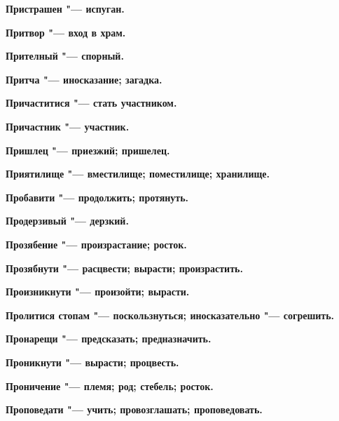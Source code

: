 \begin{mymulticols}{2}
\bfseries Пристрашен\normalfont{} "--- испуган. 




\bfseries Притвор\normalfont{} "--- вход в храм. 




\bfseries Прителный\normalfont{} "--- спорный. 




\bfseries Притча\normalfont{} "--- иносказание; загадка. 




\bfseries Причаститися\normalfont{} "--- стать участником. 




\bfseries Причастник\normalfont{} "--- участник. 




\bfseries Пришлец\normalfont{} "--- приезжий; пришелец. 




\bfseries Приятилище\normalfont{} "--- вместилище; поместилище; хранилище. 




\bfseries Пробавити\normalfont{} "--- продолжить; протянуть. 




\bfseries Продерзивый\normalfont{} "--- дерзкий. 




\bfseries Прозябение\normalfont{} "--- произрастание; росток. 




\bfseries Прозябнути\normalfont{} "--- расцвести; вырасти; произрастить. 




\bfseries Произникнути\normalfont{} "--- произойти; вырасти. 




\bfseries Пролитися стопам\normalfont{} "--- поскользнуться; иносказательно "--- согрешить. 




\bfseries Пронарещи\normalfont{} "--- предсказать; предназначить. 




\bfseries Проникнути\normalfont{} "--- вырасти; процвесть. 




\bfseries Проничение\normalfont{} "--- племя; род; стебель; росток. 




\bfseries Проповедати\normalfont{} "--- учить; провозглашать; проповедовать. 





\end{mymulticols}

